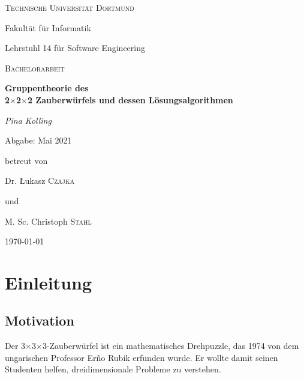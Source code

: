 \documentclass[12pt,a4paper, usenames, dvipsnames]{article}
\newcommand{\Tthree}{3$\times$3$\times$3-}
\begin{document}
\begin{titlepage}
	\centering
	{\scshape\LARGE Technische Universität Dortmund \par}
	Fakultät für Informatik \par
	Lehrstuhl 14 für Software Engineering \par
	\vspace{1cm}
	{\scshape\Large Bachelorarbeit \par }
	\vspace{1.5cm}
	{\huge\bfseries  Gruppentheorie des \\ 2$\times$2$\times$2 Zauberwürfels und dessen Lösungsalgorithmen \par}
	\vspace{2cm}
	{\Large\itshape Pina Kolling\par}
	\vspace{0.5cm}
	{Abgabe: Mai 2021 \par }
	\vfill
	betreut von\par
	Dr. \L ukasz \textsc{Czajka} \par 
	und \par 
	M. Sc. Christoph \textsc{Stahl} 

	\vfill

	{\large \today\par}
\end{titlepage}


\tableofcontents

\thispagestyle{empty} 



\newpage

\setcounter{page}{4} 
%

%
%
%
%
%
%
%
%
%
\section{Einleitung}
%
%
%
%
%
%
%
%
\subsection*{Motivation} 

Der \Tthree Zauberwürfel ist ein mathematisches Drehpuzzle, das 1974 von dem ungarischen Professor Er\~{n}o Rubik erfunden wurde. Er wollte damit seinen Studenten helfen, dreidimensionale Probleme zu verstehen. 
\end{document}
